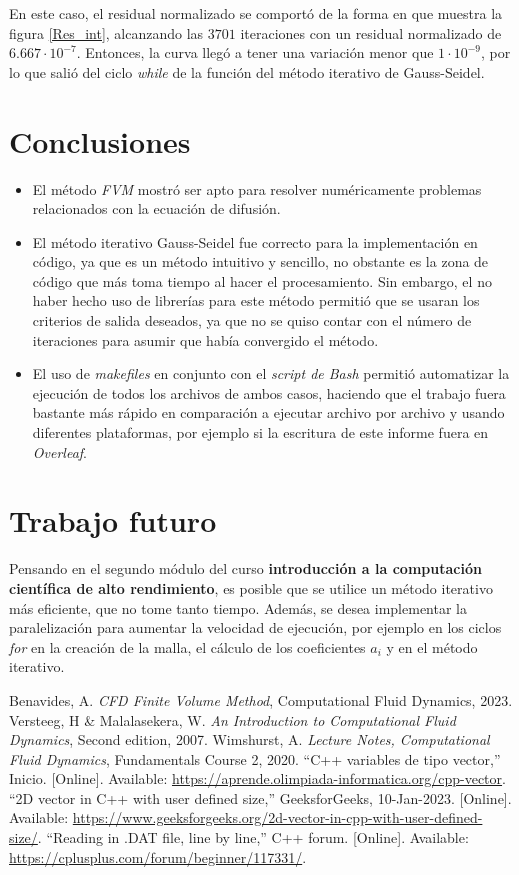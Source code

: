 \documentclass[article,latterpaper]{IEEEtran}
\begin{document}
En este caso, el residual normalizado se comportó de la forma en que muestra la figura \ref{Res_int}, alcanzando las $3701$ iteraciones con un residual normalizado de $6.667\cdot 10^{-7}$. Entonces, la curva llegó a tener una variación menor que $1\cdot 10^{-9}$, por lo que salió del ciclo \textit{while} de la función del método iterativo de Gauss-Seidel.

\section{Conclusiones}

\begin{itemize}
	\item El método \textit{FVM} mostró ser apto para resolver numéricamente problemas relacionados con la ecuación de difusión.
	\item El método iterativo Gauss-Seidel fue correcto para la implementación en código, ya que es un método intuitivo y sencillo, no obstante es la zona de código que más toma tiempo al hacer el procesamiento. Sin embargo, el no haber hecho uso de librerías para este método permitió que se usaran los criterios de salida deseados, ya que no se quiso contar con el número de iteraciones para asumir que había convergido el método.
	\item El uso de \textit{makefiles} en conjunto con el \textit{script de Bash} permitió automatizar la ejecución de todos los archivos de ambos casos, haciendo que el trabajo fuera bastante más rápido en comparación a ejecutar archivo por archivo y usando diferentes plataformas, por ejemplo si la escritura de este informe fuera en \textit{Overleaf}.
\end{itemize}

\section{Trabajo futuro}
Pensando en el segundo módulo del curso \textbf{introducción a la computación científica de alto rendimiento}, es posible que se utilice un método iterativo más eficiente, que no tome tanto tiempo. Además, se desea implementar la paralelización para aumentar la velocidad de ejecución, por ejemplo en los ciclos \textit{for} en la creación de la malla, el cálculo de los coeficientes $a_i$ y en el método iterativo.

\begin{thebibliography}{}
 Benavides, A. \textit{CFD Finite Volume Method}, Computational Fluid Dynamics, 2023.
 Versteeg, H \& Malalasekera, W. \textit{An Introduction to Computational Fluid Dynamics}, Second edition, 2007.
 Wimshurst, A. \textit{Lecture Notes, Computational Fluid Dynamics}, Fundamentals Course 2, 2020.
 “C++ variables de tipo vector,” Inicio. [Online]. Available: \url{https://aprende.olimpiada-informatica.org/cpp-vector}.
 “2D vector in C++ with user defined size,” GeeksforGeeks, 10-Jan-2023. [Online]. Available: \url{https://www.geeksforgeeks.org/2d-vector-in-cpp-with-user-defined-size/}. 
 “Reading in .DAT file, line by line,” C++ forum. [Online]. Available: \url{https://cplusplus.com/forum/beginner/117331/}. 
\end{thebibliography}
\end{document}
